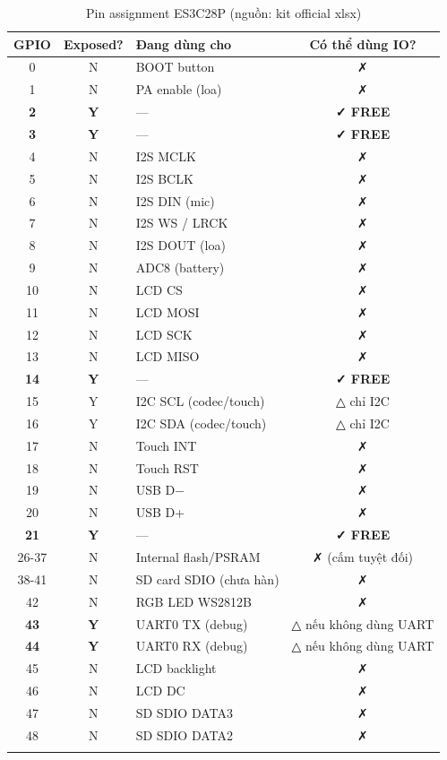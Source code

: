 \documentclass[11pt,a4paper]{article}
\begin{document}
\begin{longtable}{c|c|l|c}
\toprule
\textbf{GPIO} & \textbf{Exposed?} & \textbf{Đang dùng cho} & \textbf{Có thể dùng IO?}\\
\midrule
\endhead
0    & N & BOOT button & ✗\\
1    & N & PA enable (loa) & ✗\\
\textbf{2}    & \textbf{Y} & --- & \textbf{✓ FREE}\\
\textbf{3}    & \textbf{Y} & --- & \textbf{✓ FREE}\\
4    & N & I2S MCLK & ✗\\
5    & N & I2S BCLK & ✗\\
6    & N & I2S DIN (mic) & ✗\\
7    & N & I2S WS / LRCK & ✗\\
8    & N & I2S DOUT (loa) & ✗\\
9    & N & ADC8 (battery) & ✗\\
10   & N & LCD CS & ✗\\
11   & N & LCD MOSI & ✗\\
12   & N & LCD SCK & ✗\\
13   & N & LCD MISO & ✗\\
\textbf{14}   & \textbf{Y} & --- & \textbf{✓ FREE}\\
15   & Y & I2C SCL (codec/touch) & △ chỉ I2C\\
16   & Y & I2C SDA (codec/touch) & △ chỉ I2C\\
17   & N & Touch INT & ✗\\
18   & N & Touch RST & ✗\\
19   & N & USB D− & ✗\\
20   & N & USB D+ & ✗\\
\textbf{21}   & \textbf{Y} & --- & \textbf{✓ FREE}\\
26-37 & N & Internal flash/PSRAM & ✗ (cấm tuyệt đối)\\
38-41 & N & SD card SDIO (chưa hàn) & ✗\\
42   & N & RGB LED WS2812B & ✗\\
\textbf{43}   & \textbf{Y} & UART0 TX (debug) & △ nếu không dùng UART\\
\textbf{44}   & \textbf{Y} & UART0 RX (debug) & △ nếu không dùng UART\\
45   & N & LCD backlight & ✗\\
46   & N & LCD DC & ✗\\
47   & N & SD SDIO DATA3 & ✗\\
48   & N & SD SDIO DATA2 & ✗\\
\bottomrule
\caption{Pin assignment ES3C28P (nguồn: kit official xlsx)}
\end{longtable}
\end{document}
